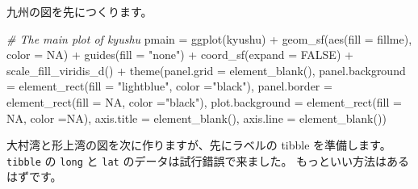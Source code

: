 \documentclass[
]{book}
\newenvironment{Shaded}{\begin{snugshade}}{\end{snugshade}}
\newcommand{\AttributeTok}[1]{\textcolor[rgb]{0.77,0.63,0.00}{#1}}
\newcommand{\CommentTok}[1]{\textcolor[rgb]{0.56,0.35,0.01}{\textit{#1}}}
\newcommand{\ConstantTok}[1]{\textcolor[rgb]{0.00,0.00,0.00}{#1}}
\newcommand{\FunctionTok}[1]{\textcolor[rgb]{0.00,0.00,0.00}{#1}}
\newcommand{\NormalTok}[1]{#1}
\newcommand{\OtherTok}[1]{\textcolor[rgb]{0.56,0.35,0.01}{#1}}
\newcommand{\SpecialCharTok}[1]{\textcolor[rgb]{0.00,0.00,0.00}{#1}}
\newcommand{\StringTok}[1]{\textcolor[rgb]{0.31,0.60,0.02}{#1}}
\theoremstyle{definition}
\theoremstyle{definition}
\theoremstyle{definition}
\theoremstyle{definition}
\theoremstyle{remark}
\begin{document}
九州の図を先につくります。

\begin{Shaded}
\begin{Highlighting}[]
\CommentTok{\# The main plot of kyushu}
\NormalTok{pmain }\OtherTok{=} \FunctionTok{ggplot}\NormalTok{(kyushu) }\SpecialCharTok{+} 
  \FunctionTok{geom\_sf}\NormalTok{(}\FunctionTok{aes}\NormalTok{(}\AttributeTok{fill =}\NormalTok{ fillme), }\AttributeTok{color =} \ConstantTok{NA}\NormalTok{) }\SpecialCharTok{+}
  \FunctionTok{guides}\NormalTok{(}\AttributeTok{fill =} \StringTok{"none"}\NormalTok{) }\SpecialCharTok{+}
  \FunctionTok{coord\_sf}\NormalTok{(}\AttributeTok{expand =} \ConstantTok{FALSE}\NormalTok{) }\SpecialCharTok{+}
  \FunctionTok{scale\_fill\_viridis\_d}\NormalTok{() }\SpecialCharTok{+}
  \FunctionTok{theme}\NormalTok{(}\AttributeTok{panel.grid =} \FunctionTok{element\_blank}\NormalTok{(),}
        \AttributeTok{panel.background =} \FunctionTok{element\_rect}\NormalTok{(}\AttributeTok{fill =} \StringTok{"lightblue"}\NormalTok{, }\AttributeTok{color =}\StringTok{"black"}\NormalTok{),}
        \AttributeTok{panel.border  =} \FunctionTok{element\_rect}\NormalTok{(}\AttributeTok{fill =} \ConstantTok{NA}\NormalTok{, }\AttributeTok{color =}\StringTok{"black"}\NormalTok{),}
        \AttributeTok{plot.background =}  \FunctionTok{element\_rect}\NormalTok{(}\AttributeTok{fill =} \ConstantTok{NA}\NormalTok{, }\AttributeTok{color =}\ConstantTok{NA}\NormalTok{),}
        \AttributeTok{axis.title =} \FunctionTok{element\_blank}\NormalTok{(),}
        \AttributeTok{axis.line =} \FunctionTok{element\_blank}\NormalTok{())}
\end{Highlighting}
\end{Shaded}

大村湾と形上湾の図を次に作りますが、先にラベルの tibble を準備します。
\texttt{tibble} の \texttt{long} と \texttt{lat} のデータは試行錯誤で来ました。
もっといい方法はあるはずです。
\end{document}
